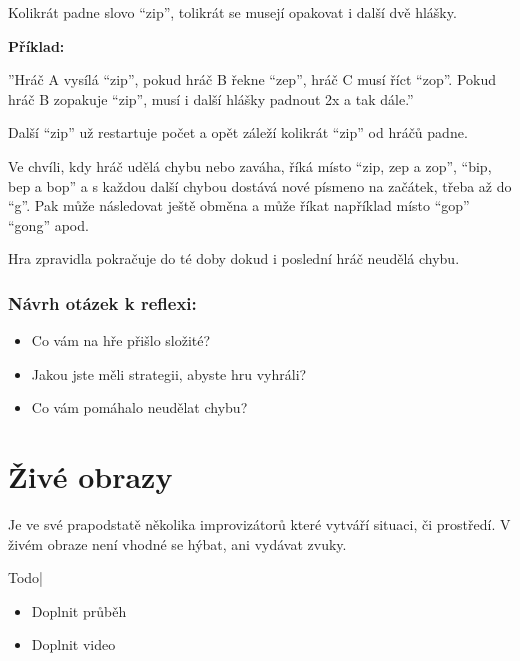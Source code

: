 \documentclass[main.tex]{subfiles}
\begin{document}
Kolikrát padne slovo “zip”, tolikrát se musejí opakovat i další dvě hlášky. 
 
 
\textbf{Příklad:}{}

 
''Hráč A vysílá “zip”, pokud hráč B řekne “zep”, hráč C musí říct “zop”. 
Pokud hráč B zopakuje “zip”, musí i další hlášky padnout 2x a tak dále.''  
 
 
Další “zip” už restartuje počet a opět záleží kolikrát “zip” od hráčů padne. 
 
Ve chvíli, kdy hráč udělá chybu nebo zaváha, říká místo “zip, zep a zop”, “bip, bep a bop” a s každou další chybou dostává nové písmeno na začátek, třeba až do “g”. Pak může následovat ještě obměna a může říkat například místo “gop” “gong” apod. 
 
Hra zpravidla pokračuje do té doby dokud i poslední hráč neudělá chybu. 
 
\subsubsection{Návrh otázek k reflexi:} \begin{itemize}
\item  Co vám na hře přišlo složité?
\item  Jakou jste měli strategii, abyste hru vyhráli?
\item  Co vám pomáhalo neudělat chybu?
\end{itemize}
 
 
 
 
 
 
 
 
 
\needspace{5cm} \section{Živé obrazy} \label{živé obrazy}  
 
Je ve své prapodstatě  několika improvizátorů které vytváří situaci, či prostředí. V živém obraze není vhodné se hýbat, ani vydávat zvuky. 
 
{{Todo| 
\begin{itemize}
\item  Doplnit průběh
\item  Doplnit video
\end{itemize}
}} 
 
 
 
 
\end{document}
